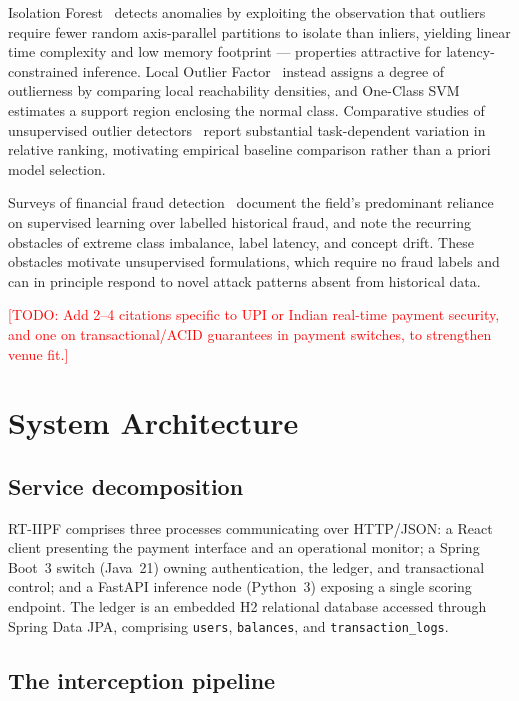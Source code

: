 \documentclass[journal]{IEEEtran}
\newcommand{\todo}[1]{\textcolor{red}{[TODO: #1]}}
\begin{document}
Isolation Forest~\cite{liu2008} detects anomalies by exploiting the
observation that outliers require fewer random axis-parallel partitions to
isolate than inliers, yielding linear time complexity and low memory
footprint --- properties attractive for latency-constrained inference. Local
Outlier Factor~\cite{breunig2000} instead assigns a degree of outlierness by
comparing local reachability densities, and One-Class SVM~\cite{scholkopf2001}
estimates a support region enclosing the normal class. Comparative studies of
unsupervised outlier detectors~\cite{campos2016} report substantial
task-dependent variation in relative ranking, motivating empirical baseline
comparison rather than a priori model selection.

Surveys of financial fraud detection~\cite{abdallah2016,adewumi2017} document
the field's predominant reliance on supervised learning over labelled
historical fraud, and note the recurring obstacles of extreme class
imbalance, label latency, and concept drift. These obstacles motivate
unsupervised formulations, which require no fraud labels and can in principle
respond to novel attack patterns absent from historical data.

\todo{Add 2--4 citations specific to UPI or Indian real-time payment
security, and one on transactional/ACID guarantees in payment switches, to
strengthen venue fit.}

\section{System Architecture}
\label{sec:arch}

\subsection{Service decomposition}

RT-IIPF comprises three processes communicating over HTTP/JSON: a React
client presenting the payment interface and an operational monitor; a Spring
Boot~3 switch (Java~21) owning authentication, the ledger, and transactional
control; and a FastAPI inference node (Python~3) exposing a single scoring
endpoint. The ledger is an embedded H2 relational database accessed through
Spring Data JPA, comprising \texttt{users}, \texttt{balances}, and
\texttt{transaction\_logs}.

\subsection{The interception pipeline}
\end{document}
